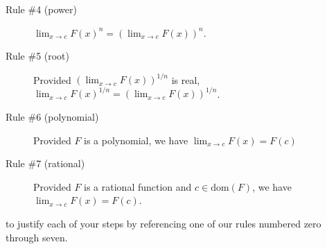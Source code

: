 \documentclass[12pt, fleqn]{exam}
\newcommand{\dom}{\mbox{dom}}
\begin{document}
\begin{questions}
\begin{description}
    \item [Rule \#4 (power)]  $ \displaystyle \lim_{x \to c} F(x)^n  = \left(\lim_{x \to c} F(x) \right)^n  $.
    
    \item [Rule \#5 (root)]  Provided $ \displaystyle  \left(\lim_{x \to c} F(x) \right)^{1/n} $ is real,  $ \displaystyle \lim_{x \to c} F(x)^{1/n}  = \left(\lim_{x \to c} F(x) \right)^{1/n}  $.
    
    \item [Rule \#6 (polynomial)]  Provided $F$ is a polynomial, we have  $ \displaystyle \lim_{x \to c} F(x) = F(c)$
    
     \item [Rule \#7 (rational)]  Provided $F$ is a rational function and $c \in \dom(F)$, we have  \mbox{$ \displaystyle \lim_{x \to c} F(x) = F(c)$.}
    \end{description}

    to justify each of your 
    steps by referencing one of our rules numbered zero through seven.
    
\end{questions}
\end{document}
